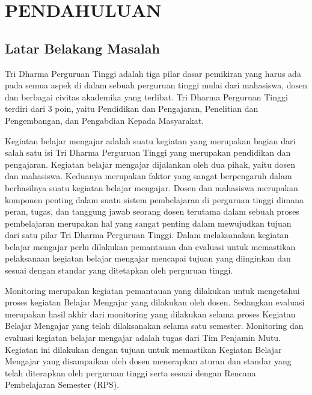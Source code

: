 
\chapter{PENDAHULUAN}

\section{Latar Belakang Masalah}
	Tri Dharma Perguruan Tinggi adalah tiga pilar dasar pemikiran yang harus ada pada semua aspek di dalam sebuah perguruan tinggi mulai dari mahasiswa, dosen dan berbagai civitas akademika yang terlibat. Tri Dharma Perguruan Tinggi terdiri dari 3 poin, yaitu Pendidikan dan Pengajaran, Penelitian dan Pengembangan, dan Pengabdian Kepada Masyarakat.

	Kegiatan belajar mengajar adalah suatu kegiatan yang merupakan bagian dari salah satu isi Tri Dharma Perguruan Tinggi yang merupakan pendidikan dan pengajaran. Kegiatan belajar mengajar dijalankan oleh dua pihak, yaitu dosen dan mahasiswa. Keduanya merupakan faktor yang sangat berpengaruh dalam berhasilnya suatu kegiatan belajar mengajar. Dosen dan mahasiswa merupakan komponen penting dalam suatu sistem pembelajaran di perguruan tinggi dimana peran, tugas, dan tanggung jawab seorang dosen terutama dalam sebuah proses pembelajaran merupakan hal yang sangat penting dalam mewujudkan tujuan dari satu pilar Tri Dharma Perguruan Tinggi. Dalam melaksanakan kegiatan belajar mengajar perlu dilakukan pemantauan dan evaluasi untuk memastikan pelaksanaan kegiatan belajar mengajar mencapai tujuan yang diinginkan dan sesuai dengan standar yang ditetapkan oleh perguruan tinggi.

	Monitoring merupakan kegiatan pemantauan yang dilakukan untuk mengetahui proses kegiatan Belajar Mengajar yang dilakukan oleh dosen. Sedangkan evaluasi merupakan hasil akhir dari monitoring yang dilakukan selama proses Kegiatan Belajar Mengajar yang telah dilaksanakan selama satu semester. Monitoring dan evaluasi kegiatan belajar mengajar adalah tugas dari Tim Penjamin Mutu. Kegiatan ini dilakukan dengan tujuan untuk memastikan Kegiatan Belajar Mengajar yang disampaikan oleh dosen menerapkan aturan dan standar yang telah diterapkan oleh perguruan tinggi serta sesuai dengan Rencana Pembelajaran Semester (RPS).

